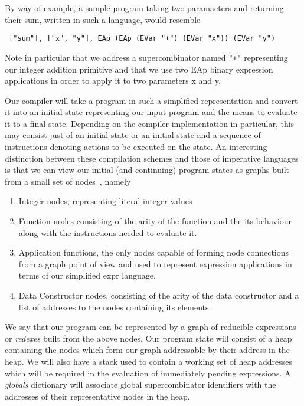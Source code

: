 \noindent By way of example, a sample program taking two paramaeters and returning
their sum, written in such a language, would resemble

\begin{verbatim}
 ["sum"], ["x", "y"], EAp (EAp (EVar "+") (EVar "x")) (EVar "y")
\end{verbatim}

\noindent Note in particular that we address a supercombinator named \verb!"+"!
representing our integer addition primitive and that we use two EAp 
binary expression applications in order to apply it to two parameters x and y.

Our compiler will take a program in such a simplified representation
and convert it into an initial state representing our input program and the
means to evaluate it to a final state. Depending on the compiler implementation
in particular, this may consist just of an initial state or an initial state
and a sequence of instructions denoting actions to be executed on the state. 
An interesting 
distinction between these compilation schemes and those of imperative languages
is that we can view our initial (and continuing) program states as graphs built
from a small set of nodes~\cite[pp.185]{SPJ}, namely

\begin{enumerate}
	\item Integer nodes, representing literal integer values
	\item Function nodes consisting of the arity of the function and the
		  its behaviour along with the instructions needed to evaluate it.
	\item Application functions, the only nodes capable of forming 
		  node connections from a graph point of view and used to represent
		  expression applications in terms of our simplified expr language.
	\item Data Constructor nodes, consisting of the arity of the data
		  constructor and a list of addresses to the nodes containing its
		  elements.
\end{enumerate}

We say that our program can be represented by a graph of reducible expressions
or \emph{redexes} built from the above nodes. 
Our program state will consist of a heap containing the nodes which form
our graph addressable by their address in the heap. We will
also have a stack used to contain a working set of heap addresses which 
will be required in the evaluation of immediately pending expressions. A 
\emph{globals} dictionary will associate global supercombinator identifiers with the
addresses of their representative nodes in the heap. \\

